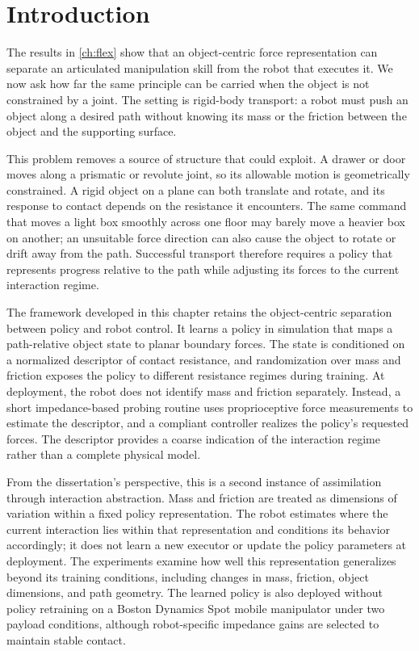 \section{Introduction}
\label{sec:pho_motivation}

The results in \cref{ch:flex} show that an object-centric force representation can separate an articulated manipulation skill from the robot that executes it. We now ask how far the same principle can be carried when the object is not constrained by a joint. The setting is rigid-body transport: a robot must push an object along a desired path without knowing its mass or the friction between the object and the supporting surface.

This problem removes a source of structure that \FLEX{} could exploit. A drawer or door moves along a prismatic or revolute joint, so its allowable motion is geometrically constrained. A rigid object on a plane can both translate and rotate, and its response to contact depends on the resistance it encounters. The same command that moves a light box smoothly across one floor may barely move a heavier box on another; an unsuitable force direction can also cause the object to rotate or drift away from the path. Successful transport therefore requires a policy that represents progress relative to the path while adjusting its forces to the current interaction regime.

The framework developed in this chapter retains the object-centric separation between policy and robot control. It learns a policy in simulation that maps a path-relative object state to planar boundary forces. The state is conditioned on a normalized descriptor of contact resistance, and randomization over mass and friction exposes the policy to different resistance regimes during training. At deployment, the robot does not identify mass and friction separately. Instead, a short impedance-based probing routine uses proprioceptive force measurements to estimate the descriptor, and a compliant controller realizes the policy's requested forces. The descriptor provides a coarse indication of the interaction regime rather than a complete physical model.

From the dissertation's perspective, this is a second instance of assimilation through interaction abstraction. Mass and friction are treated as dimensions of variation within a fixed policy representation. The robot estimates where the current interaction lies within that representation and conditions its behavior accordingly; it does not learn a new executor or update the policy parameters at deployment. The experiments examine how well this representation generalizes beyond its training conditions, including changes in mass, friction, object dimensions, and path geometry. The learned policy is also deployed without policy retraining on a Boston Dynamics Spot mobile manipulator under two payload conditions, although robot-specific impedance gains are selected to maintain stable contact.


